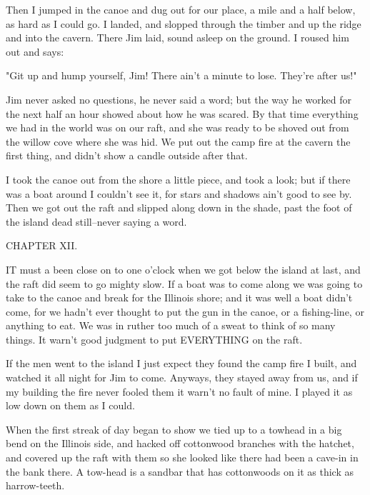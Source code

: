 Then I jumped in the canoe and dug out for our place, a mile and a half
below, as hard as I could go.  I landed, and slopped through the timber
and up the ridge and into the cavern.  There Jim laid, sound asleep on
the ground.  I roused him out and says:

"Git up and hump yourself, Jim!  There ain't a minute to lose.  They're
after us!"

Jim never asked no questions, he never said a word; but the way he worked
for the next half an hour showed about how he was scared.  By that time
everything we had in the world was on our raft, and she was ready to be
shoved out from the willow cove where she was hid.  We put out the camp
fire at the cavern the first thing, and didn't show a candle outside
after that.

I took the canoe out from the shore a little piece, and took a look; but
if there was a boat around I couldn't see it, for stars and shadows ain't
good to see by.  Then we got out the raft and slipped along down in the
shade, past the foot of the island dead still--never saying a word.




CHAPTER XII.

IT must a been close on to one o'clock when we got below the island at
last, and the raft did seem to go mighty slow.  If a boat was to come
along we was going to take to the canoe and break for the Illinois shore;
and it was well a boat didn't come, for we hadn't ever thought to put the
gun in the canoe, or a fishing-line, or anything to eat.  We was in
ruther too much of a sweat to think of so many things.  It warn't good
judgment to put EVERYTHING on the raft.

If the men went to the island I just expect they found the camp fire I
built, and watched it all night for Jim to come.  Anyways, they stayed
away from us, and if my building the fire never fooled them it warn't no
fault of mine.  I played it as low down on them as I could.

When the first streak of day began to show we tied up to a towhead in a
big bend on the Illinois side, and hacked off cottonwood branches with
the hatchet, and covered up the raft with them so she looked like there
had been a cave-in in the bank there.  A tow-head is a sandbar that has
cottonwoods on it as thick as harrow-teeth.


